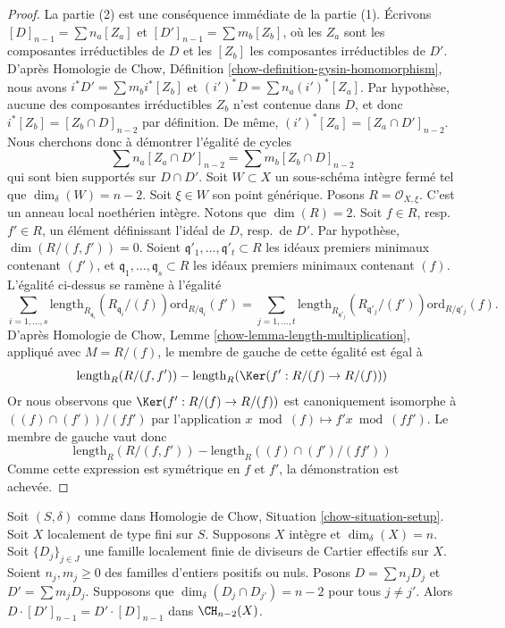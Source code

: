 \begin{proof}
La partie (2) est une conséquence immédiate de la partie (1).
Écrivons $[D]_{n - 1} = \sum n_a[Z_a]$ et
$[D']_{n - 1} = \sum m_b[Z_b]$, où les $Z_a$ sont les composantes irréductibles
de $D$ et les $[Z_b]$ les composantes irréductibles
de $D'$. D'après
Homologie de Chow, Définition \ref{chow-definition-gysin-homomorphism},
nous avons $i^*D' = \sum m_b i^*[Z_b]$ et $(i')^*D = \sum n_a(i')^*[Z_a]$.
Par hypothèse, aucune des composantes irréductibles $Z_b$
n'est contenue dans $D$, et donc $i^*[Z_b] = [Z_b\cap D]_{n - 2}$
par définition. De même, $(i')^*[Z_a] = [Z_a \cap D']_{n - 2}$.
Nous cherchons donc à démontrer l'égalité de cycles
$$
\sum n_a[Z_a \cap D']_{n - 2} = \sum m_b[Z_b \cap D]_{n - 2}
$$
qui sont bien supportés sur $D \cap D'$.
Soit $W \subset X$ un sous-schéma intègre fermé
tel que $\dim_\delta(W) = n - 2$. Soit $\xi \in W$ son point générique.
Posons $R = \mathcal{O}_{X, \xi}$. C'est un anneau local noethérien intègre.
Notons que $\dim(R) = 2$. Soit $f \in R$, resp.\ $f' \in R$,
un élément définissant l'idéal de $D$, resp.\ de $D'$.
Par hypothèse, $\dim(R/(f, f')) = 0$. Soient
$\mathfrak q'_1, \ldots, \mathfrak q'_t \subset R$ les idéaux premiers minimaux
contenant $(f')$, et $\mathfrak q_1, \ldots, \mathfrak q_s \subset R$ les idéaux premiers minimaux
contenant $(f)$.
L'égalité ci-dessus se ramène à l'égalité
$$
\sum_{i = 1, \ldots, s}
\text{length}_{R_{\mathfrak q_i}}(R_{\mathfrak q_i}/(f))
\text{ord}_{R/\mathfrak q_i}(f')
=
\sum_{j = 1, \ldots, t}
\text{length}_{R_{\mathfrak q'_j}}(R_{\mathfrak q'_j}/(f'))
\text{ord}_{R/\mathfrak q'_j}(f).
$$
D'après Homologie de Chow, Lemme \ref{chow-lemma-length-multiplication}, 
appliqué avec $M = R/(f)$, le membre de gauche de
cette égalité est égal à
$$
\text{length}_R(R/(f, f'))
-
\text{length}_R(\Ker(f' : R/(f) \to R/(f)))
$$
Or nous observons que
$\Ker(f' : R/(f) \to R/(f))$ est canoniquement isomorphe
à $((f) \cap (f'))/(ff')$ par l'application $x \bmod (f) \mapsto
f'x \bmod (ff')$. Le membre de gauche vaut donc
$$
\text{length}_R(R/(f, f'))
-
\text{length}_R((f) \cap (f')/(ff'))
$$
Comme cette expression est symétrique en $f$ et $f'$, la démonstration est achevée.
\end{proof}

\begin{lemma}
\label{lemma-commutativity-effective-Cartier-proper-intersection-infinite}
Soit $(S, \delta)$ comme dans Homologie de Chow, Situation \ref{chow-situation-setup}.
Soit $X$ localement de type fini sur $S$.
Supposons $X$ intègre et $\dim_\delta(X) = n$.
Soit $\{D_j\}_{j \in J}$ une famille localement finie de
diviseurs de Cartier effectifs sur $X$. Soient $n_j, m_j \geq 0$ des
familles d'entiers positifs ou nuls. Posons
$D = \sum n_j D_j$ et $D' = \sum m_j D_j$.
Supposons que $\dim_\delta(D_j \cap D_{j'}) = n - 2$ pour tous
$j \not = j'$. Alors $D \cdot [D']_{n - 1} = D' \cdot [D]_{n - 1}$ dans
$\CH_{n - 2}(X)$.
\end{lemma}

